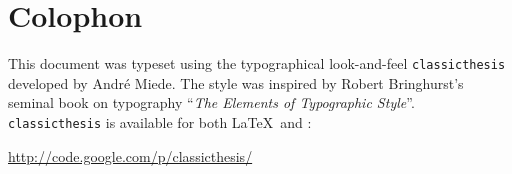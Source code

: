 \pagestyle{empty}

\hfill

\vfill


\section*{Colophon}
This document was typeset using the typographical look-and-feel \texttt{classicthesis} developed by Andr\'e Miede. 
The style was inspired by Robert Bringhurst's seminal book on typography ``\emph{The Elements of Typographic Style}''. 
\texttt{classicthesis} is available for both \LaTeX\ and \mLyX: 
\begin{center}
\url{http://code.google.com/p/classicthesis/}
\bigskip

\end{center} 



%
%




